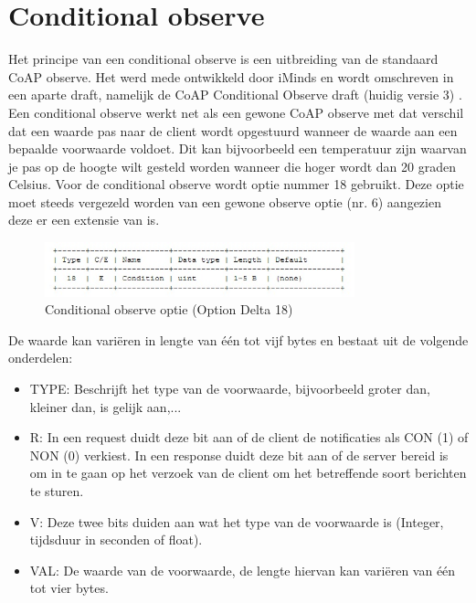\section{Conditional observe}

Het principe van een conditional observe is een uitbreiding van de standaard CoAP observe. Het werd mede ontwikkeld door iMinds en wordt omschreven in een aparte draft, namelijk de
CoAP Conditional Observe draft (huidig versie 3) \cite{coapConditionalObserveDraft}.\\

Een conditional observe werkt net als een gewone CoAP observe met dat verschil dat een waarde pas naar de client wordt opgestuurd wanneer de waarde aan een bepaalde voorwaarde
voldoet. Dit kan bijvoorbeeld een temperatuur zijn waarvan je pas op de hoogte wilt gesteld worden wanneer die hoger wordt dan 20 graden Celsius.
Voor de conditional observe wordt optie nummer 18 gebruikt. Deze optie moet steeds vergezeld worden van een gewone observe optie (nr. 6) aangezien deze er een extensie van is.

\begin{figure}[h!]
\centering
\includegraphics[width=0.8\textwidth]{fig/conditional}
\caption{Conditional observe optie (Option Delta 18)}
\end{figure}

De waarde kan vari\"{e}ren in lengte van \'{e}\'{e}n tot vijf bytes en bestaat uit de volgende onderdelen:
\begin{itemize}
\item TYPE: Beschrijft het type van de voorwaarde, bijvoorbeeld groter dan, kleiner dan, is gelijk aan,...
\item R: In een request duidt deze bit aan of de client de notificaties als CON (1) of NON (0) verkiest. In een response duidt deze bit aan of de server bereid is om in te gaan op het verzoek van de client om het betreffende soort berichten te sturen.
\item V: Deze twee bits duiden aan wat het type van de voorwaarde is (Integer, tijdsduur in seconden of float).
\item VAL: De waarde van de voorwaarde, de lengte hiervan kan vari\"{e}ren van \'{e}\'{e}n tot vier bytes.
\end{itemize}


